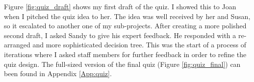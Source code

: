 Figure \ref{fig:quiz_draft} shows my first draft of the quiz.
I showed this to Joan when I pitched the quiz idea to her.
The idea was well received by her and Susan, so it escalated to another one of my sub-projects.
After creating a more polished second draft, I asked Sandy to give his expert feedback.
He responded with a re-arranged and more sophisticated decision tree.
This was the start of a process of iterations where I asked staff members for further feedback in order to refine the quiz design.
The full-sized version of the final quiz (Figure \ref{fig:quiz_final}) can been found in Appendix \ref{App:quiz}.




